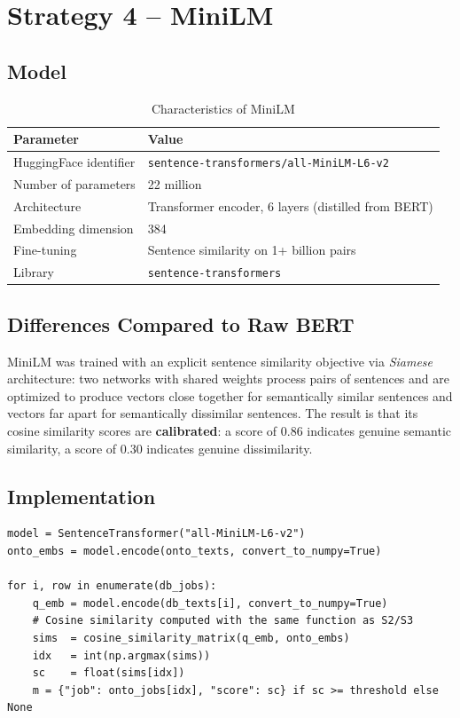 \documentclass[12pt, a4paper]{report}
\begin{document}
% 
\section{Strategy 4 -- MiniLM}

\subsection{Model}

\begin{table}[H]
\centering
\begin{tabular}{ll}
\toprule
\textbf{Parameter} & \textbf{Value} \\
\midrule
HuggingFace identifier & \texttt{sentence-transformers/all-MiniLM-L6-v2} \\
Number of parameters & 22 million \\
Architecture & Transformer encoder, 6 layers (distilled from BERT) \\
Embedding dimension & 384 \\
Fine-tuning & Sentence similarity on 1+ billion pairs \\
Library & \texttt{sentence-transformers} \\
\bottomrule
\end{tabular}
\caption{Characteristics of MiniLM}
\end{table}

\subsection{Differences Compared to Raw BERT}

MiniLM was trained with an explicit sentence similarity objective
via \emph{Siamese} architecture: two networks with shared weights
process pairs of sentences and are optimized to produce
vectors close together for semantically similar sentences and vectors
far apart for semantically dissimilar sentences. The result is that its
cosine similarity scores are \textbf{calibrated}: a score of 0.86
indicates genuine semantic similarity, a score of 0.30 indicates
genuine dissimilarity.

\subsection{Implementation}

\begin{lstlisting}[caption={Matching with MiniLM}]
model = SentenceTransformer("all-MiniLM-L6-v2")
onto_embs = model.encode(onto_texts, convert_to_numpy=True)

for i, row in enumerate(db_jobs):
    q_emb = model.encode(db_texts[i], convert_to_numpy=True)
    # Cosine similarity computed with the same function as S2/S3
    sims  = cosine_similarity_matrix(q_emb, onto_embs)
    idx   = int(np.argmax(sims))
    sc    = float(sims[idx])
    m = {"job": onto_jobs[idx], "score": sc} if sc >= threshold else None
\end{lstlisting}
\end{document}
